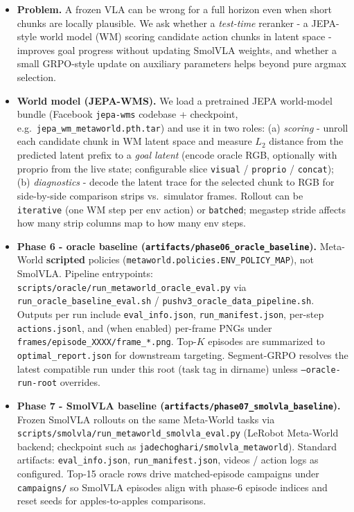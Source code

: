 \documentclass{article}
\begin{document}
\begin{itemize}
  \item \textbf{Problem.} A frozen VLA can be wrong for a full horizon even when short chunks are locally plausible. We ask whether a \emph{test-time} reranker - a JEPA-style world model (WM) scoring candidate action chunks in latent space - improves goal progress without updating SmolVLA weights, and whether a small GRPO-style update on auxiliary parameters helps beyond pure argmax selection.

  \item \textbf{World model (JEPA-WMS).} We load a pretrained JEPA world-model bundle (Facebook \texttt{jepa-wms} codebase + checkpoint, e.g.\ \texttt{jepa\_wm\_metaworld.pth.tar}) and use it in two roles: (a) \emph{scoring} - unroll each candidate chunk in WM latent space and measure $L_2$ distance from the predicted latent prefix to a \emph{goal latent} (encode oracle RGB, optionally with proprio from the live state; configurable slice \texttt{visual} / \texttt{proprio} / \texttt{concat}); (b) \emph{diagnostics} - decode the latent trace for the selected chunk to RGB for side-by-side comparison strips vs.\ simulator frames. Rollout can be \texttt{iterative} (one WM step per env action) or \texttt{batched}; megastep stride affects how many strip columns map to how many env steps.

  \item \textbf{Phase 6  -  oracle baseline (\texttt{artifacts/phase06\_oracle\_baseline}).} Meta-World \textbf{scripted} policies (\texttt{metaworld.policies.ENV\_POLICY\_MAP}), not SmolVLA. Pipeline entrypoints: \texttt{scripts/oracle/run\_metaworld\_oracle\_eval.py} via \texttt{run\_oracle\_baseline\_eval.sh} / \texttt{pushv3\_oracle\_data\_pipeline.sh}. Outputs per run include \texttt{eval\_info.json}, \texttt{run\_manifest.json}, per-step \texttt{actions.jsonl}, and (when enabled) per-frame PNGs under \texttt{frames/episode\_XXXX/frame\_*.png}. Top-$K$ episodes are summarized to \texttt{optimal\_report.json} for downstream targeting. Segment-GRPO resolves the latest compatible run under this root (task tag in dirname) unless \texttt{--oracle-run-root} overrides.

  \item \textbf{Phase 7  -  SmolVLA baseline (\texttt{artifacts/phase07\_smolvla\_baseline}).} Frozen SmolVLA rollouts on the same Meta-World tasks via \texttt{scripts/smolvla/run\_metaworld\_smolvla\_eval.py} (LeRobot Meta-World backend; checkpoint such as \texttt{jadechoghari/smolvla\_metaworld}). Standard artifacts: \texttt{eval\_info.json}, \texttt{run\_manifest.json}, videos / action logs as configured. Top-15 oracle rows drive matched-episode campaigns under \texttt{campaigns/} so SmolVLA episodes align with phase-6 episode indices and reset seeds for apples-to-apples comparisons.


\end{itemize}
\end{document}
